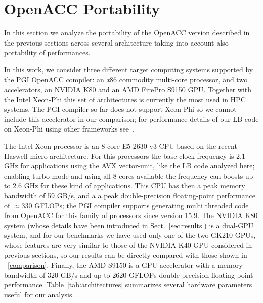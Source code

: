 \documentclass[times]{cpeauth}
\begin{document}
\section{OpenACC Portability}\label{sec:portability}

In this section we analyze the portability of the OpenACC version described in
the previous sections across several architecture taking into account
also portability of performances.

In this work, we consider three different target computing systems
supported by the PGI OpenACC compiler: an {\em x}86 commodity multi-core
processor, and two accelerators, an NVIDIA K80 and an AMD FirePro S9150
GPU.
%
Together with the Intel Xeon-Phi this set of architectures is currently 
the most used in HPC systems. The PGI compiler so far does not support Xeon-Phi
so we cannot include this accelerator in our comparison; for performance 
details of our LB code on Xeon-Phi using other frameworks see~\cite{iccs13,europar14}. 
 
The Intel Xeon processor is an 8-core E5-2630 v3 CPU based 
on the recent Haswell micro-architecture. For this processors the 
base clock frequency is 2.1 GHz for applications using the AVX vector-unit, like the LB code analyzed here; enabling turbo-mode and 
using all 8 cores available the frequency can boosts up to 2.6 GHz for these kind of applications. This CPU has then 
a peak memory bandwidth of 59 GB/s, and a a peak double-precision floating-point 
performance of $\approx 330$ GFLOPs; the PGI compiler supports generating multi threaded code from OpenACC for this family of processors since version 15.9. 
%
%
The NVIDIA K80 system (whose details have been introduced in Sect.~\ref{sec:results}) 
is a dual-GPU system, and for our benchmarks we have used only one of the two GK210 
GPUs, whose features are very similar to those of the NVIDIA K40 GPU considered in 
previous sections, so our results can be directly compared with those shown in
\tablename~\ref{comparison}. 
%
Finally, the AMD S9150 is a GPU accelerator with a memory bandwidth of 320 GB/s 
and  up to 2620 GFLOPs double-precision floating point performance.
% 
Table~\ref{tab:architectures} summarizes several hardware 
parameters useful for our analysis.
\end{document}

